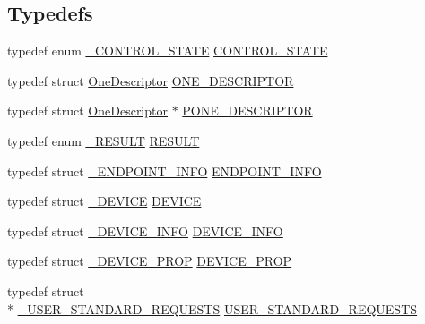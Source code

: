 \subsection*{Typedefs}
\begin{DoxyCompactItemize}
\item 
typedef enum \hyperlink{_s_t_m32_f10x_2_libraries_2_s_t_m32___u_s_b-_f_s-_device___driver_2inc_2usb__core_8h_a88c28862a896605c15eb3243cfae491f}{\-\_\-\-C\-O\-N\-T\-R\-O\-L\-\_\-\-S\-T\-A\-T\-E} \hyperlink{_s_t_m32_f10x_2_libraries_2_s_t_m32___u_s_b-_f_s-_device___driver_2inc_2usb__core_8h_a8d095984627f0ea2cb9b5140ff7341fc}{C\-O\-N\-T\-R\-O\-L\-\_\-\-S\-T\-A\-T\-E}
\item 
typedef struct \hyperlink{struct_one_descriptor}{One\-Descriptor} \hyperlink{_s_t_m32_f10x_2_libraries_2_s_t_m32___u_s_b-_f_s-_device___driver_2inc_2usb__core_8h_aecb1ac02fecb54620d01af4fccf4c51e}{O\-N\-E\-\_\-\-D\-E\-S\-C\-R\-I\-P\-T\-O\-R}
\item 
typedef struct \hyperlink{struct_one_descriptor}{One\-Descriptor} $\ast$ \hyperlink{_s_t_m32_f10x_2_libraries_2_s_t_m32___u_s_b-_f_s-_device___driver_2inc_2usb__core_8h_a0108bfe92b722a4cca7401e3b2491878}{P\-O\-N\-E\-\_\-\-D\-E\-S\-C\-R\-I\-P\-T\-O\-R}
\item 
typedef enum \hyperlink{_s_t_m32_f10x_2_libraries_2_s_t_m32___u_s_b-_f_s-_device___driver_2inc_2usb__core_8h_a4f5f2a92b77700a9807e498683faa407}{\-\_\-\-R\-E\-S\-U\-L\-T} \hyperlink{_s_t_m32_f10x_2_libraries_2_s_t_m32___u_s_b-_f_s-_device___driver_2inc_2usb__core_8h_ac0c5cc7751807fb0264baeab942bc8c3}{R\-E\-S\-U\-L\-T}
\item 
typedef struct \hyperlink{struct___e_n_d_p_o_i_n_t___i_n_f_o}{\-\_\-\-E\-N\-D\-P\-O\-I\-N\-T\-\_\-\-I\-N\-F\-O} \hyperlink{_s_t_m32_f10x_2_libraries_2_s_t_m32___u_s_b-_f_s-_device___driver_2inc_2usb__core_8h_a19ad46709b2d54f72c82ed0b9befdb99}{E\-N\-D\-P\-O\-I\-N\-T\-\_\-\-I\-N\-F\-O}
\item 
typedef struct \hyperlink{struct___d_e_v_i_c_e}{\-\_\-\-D\-E\-V\-I\-C\-E} \hyperlink{_s_t_m32_f10x_2_libraries_2_s_t_m32___u_s_b-_f_s-_device___driver_2inc_2usb__core_8h_a85594805bde95346bc3a19853317a89d}{D\-E\-V\-I\-C\-E}
\item 
typedef struct \hyperlink{struct___d_e_v_i_c_e___i_n_f_o}{\-\_\-\-D\-E\-V\-I\-C\-E\-\_\-\-I\-N\-F\-O} \hyperlink{_s_t_m32_f10x_2_libraries_2_s_t_m32___u_s_b-_f_s-_device___driver_2inc_2usb__core_8h_a6c959d0e0181f5f4b6a8b6b3f8e16760}{D\-E\-V\-I\-C\-E\-\_\-\-I\-N\-F\-O}
\item 
typedef struct \hyperlink{struct___d_e_v_i_c_e___p_r_o_p}{\-\_\-\-D\-E\-V\-I\-C\-E\-\_\-\-P\-R\-O\-P} \hyperlink{_s_t_m32_f10x_2_libraries_2_s_t_m32___u_s_b-_f_s-_device___driver_2inc_2usb__core_8h_a90353becd4185446508b796a7f39fbce}{D\-E\-V\-I\-C\-E\-\_\-\-P\-R\-O\-P}
\item 
typedef struct \\*
\hyperlink{struct___u_s_e_r___s_t_a_n_d_a_r_d___r_e_q_u_e_s_t_s}{\-\_\-\-U\-S\-E\-R\-\_\-\-S\-T\-A\-N\-D\-A\-R\-D\-\_\-\-R\-E\-Q\-U\-E\-S\-T\-S} \hyperlink{_s_t_m32_f10x_2_libraries_2_s_t_m32___u_s_b-_f_s-_device___driver_2inc_2usb__core_8h_abf9887b82ae511cfb155d0d97c9a7c1a}{U\-S\-E\-R\-\_\-\-S\-T\-A\-N\-D\-A\-R\-D\-\_\-\-R\-E\-Q\-U\-E\-S\-T\-S}
\end{DoxyCompactItemize}
